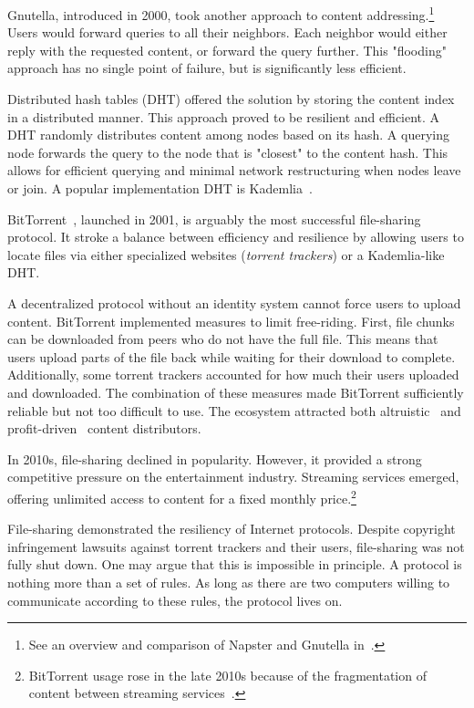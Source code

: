 Gnutella, introduced in 2000, took another approach to content addressing.\footnote{See an overview and comparison of Napster and Gnutella in~\cite{Saroiu2003}.}
Users would forward queries to all their neighbors.
Each neighbor would either reply with the requested content, or forward the query further.
This "flooding" approach has no single point of failure, but is significantly less efficient.

Distributed hash tables (DHT) offered the solution by storing the content index in a distributed manner.
This approach proved to be resilient and efficient.
A DHT randomly distributes content among nodes based on its hash.
A querying node forwards the query to the node that is "closest" to the content hash.
This allows for efficient querying and minimal network restructuring when nodes leave or join.
A popular implementation DHT is Kademlia~\cite{Maymounkov2002}.

BitTorrent~\cite{Pouwelse2005}, launched in 2001, is arguably the most successful file-sharing protocol.
It stroke a balance between efficiency and resilience by allowing users to locate files via either specialized websites (\textit{torrent trackers}) or a Kademlia-like DHT.

A decentralized protocol without an identity system cannot force users to upload content.
BitTorrent implemented measures to limit free-riding.
First, file chunks can be downloaded from peers who do not have the full file.
This means that users upload parts of the file back while waiting for their download to complete.
Additionally, some torrent trackers accounted for how much their users uploaded and downloaded.
The combination of these measures made BitTorrent sufficiently reliable but not too difficult to use.
The ecosystem attracted both altruistic~\cite{Rehn2004} and profit-driven~\cite{Rumin2010} content distributors.

In 2010s, file-sharing declined in popularity.
However, it provided a strong competitive pressure on the entertainment industry.
Streaming services emerged, offering unlimited access to content for a fixed monthly price.\footnote{BitTorrent usage rose in the late 2010s because of the fragmentation of content between streaming services~\cite{Bode2018}.}

File-sharing demonstrated the resiliency of Internet protocols.
Despite copyright infringement lawsuits against torrent trackers and their users, file-sharing was not fully shut down.
One may argue that this is impossible in principle.
A protocol is nothing more than a set of rules.
As long as there are two computers willing to communicate according to these rules, the protocol lives on.

